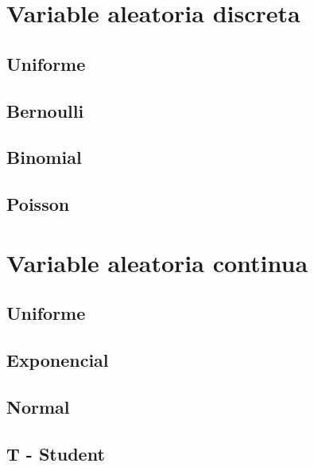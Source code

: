 \documentclass[
]{book}
\begin{document}
\hypertarget{variable-aleatoria-discreta}{%
\section{Variable aleatoria discreta}\label{variable-aleatoria-discreta}}

\hypertarget{uniforme}{%
\subsection{Uniforme}\label{uniforme}}

\hypertarget{bernoulli}{%
\subsection{Bernoulli}\label{bernoulli}}

\hypertarget{binomial}{%
\subsection{Binomial}\label{binomial}}

\hypertarget{poisson}{%
\subsection{Poisson}\label{poisson}}

\hypertarget{variable-aleatoria-continua}{%
\section{Variable aleatoria continua}\label{variable-aleatoria-continua}}

\hypertarget{uniforme-1}{%
\subsection{Uniforme}\label{uniforme-1}}

\hypertarget{exponencial}{%
\subsection{Exponencial}\label{exponencial}}

\hypertarget{normal}{%
\subsection{Normal}\label{normal}}

\hypertarget{t---student}{%
\subsection{T - Student}\label{t---student}}
\end{document}
